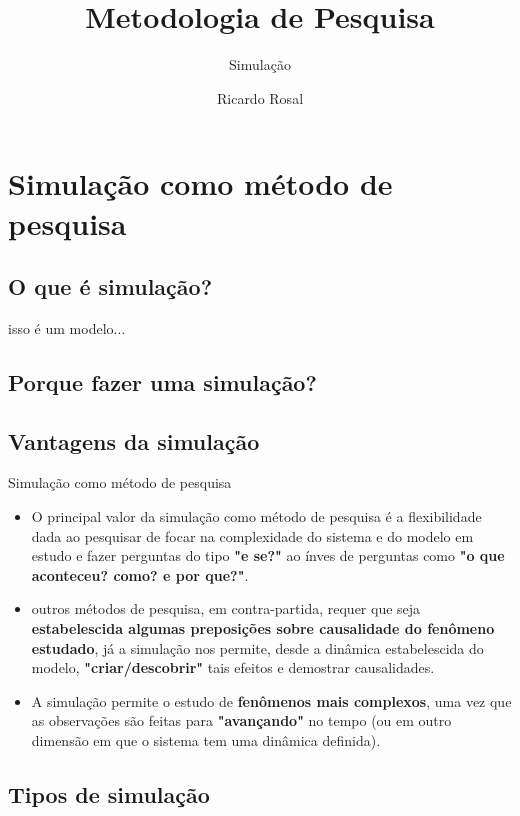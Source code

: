 \documentclass{beamer}
\title{Metodologia de Pesquisa}
\subtitle{Simulação}
\author{Ricardo Rosal}
\begin{document}
	\begin{frame}[plain]
	\maketitle
	\end{frame}	
	\begin{frame}
		\tableofcontents
	\end{frame}
	\section{Simulação como método de pesquisa}
		\subsection{O que é simulação?}
		isso é um modelo...
	
	
	\subsection{Porque fazer uma simulação?}
	\subsection{Vantagens da simulação}
	
	\begin{frame}{Simulação como método de pesquisa}
		\begin{itemize}[<+->]
			\item O principal valor da simulação como método de pesquisa é a flexibilidade dada ao pesquisar de focar na complexidade do sistema e do modelo em estudo e fazer perguntas do tipo \textbf{"e se?"} ao ínves de perguntas como \textbf{"o que aconteceu? como? e por que?"}.
			\item outros métodos de pesquisa, em contra-partida, requer que seja \textbf{estabelescida algumas preposições sobre causalidade do fenômeno estudado}, já a simulação nos permite, desde a dinâmica estabelescida do modelo, \textbf{"criar/descobrir"} tais efeitos e demostrar causalidades.
			\item A simulação permite o estudo de \textbf{fenômenos mais complexos}, uma vez que as observações são feitas para \textbf{"avançando"} no tempo (ou em outro dimensão em que o sistema tem uma dinâmica definida).
		\end{itemize}
	\end{frame}
	\subsection{Tipos de simulação}
\end{document}
